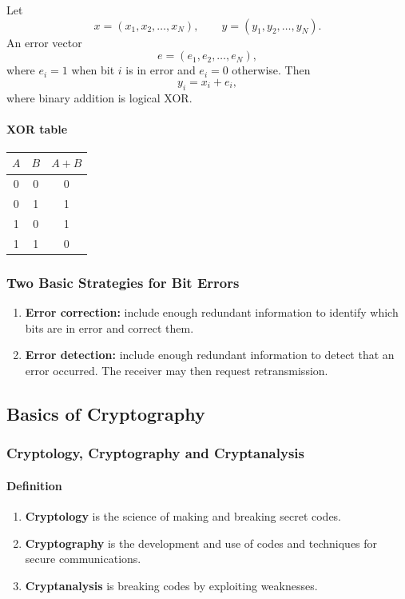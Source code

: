 \documentclass[12pt]{article}
\newcommand{\Definition}{\paragraph{Definition}}
\begin{document}
Let
\[
x=(x_1,x_2,\ldots,x_N),\qquad y=(y_1,y_2,\ldots,y_N).
\]
An error vector
\[
e=(e_1,e_2,\ldots,e_N),
\]
where $e_i=1$ when bit $i$ is in error and $e_i=0$ otherwise. Then
\[
y_i=x_i+e_i,
\]
where binary addition is logical XOR.

\paragraph{XOR table}
\begin{center}
\begin{tabular}{ccc}
\toprule
$A$ & $B$ & $A+B$\\
\midrule
0&0&0\\
0&1&1\\
1&0&1\\
1&1&0\\
\bottomrule
\end{tabular}
\end{center}

\subsubsection{Two Basic Strategies for Bit Errors}
\begin{enumerate}
    \item \textbf{Error correction:} include enough redundant information to identify which bits are in error and correct them.
    \item \textbf{Error detection:} include enough redundant information to detect that an error occurred. The receiver may then request retransmission.
\end{enumerate}

\subsection{Basics of Cryptography}

\subsubsection{Cryptology, Cryptography and Cryptanalysis}
\Definition
\begin{enumerate}
    \item \textbf{Cryptology} is the science of making and breaking secret codes.
    \item \textbf{Cryptography} is the development and use of codes and techniques for secure communications.
    \item \textbf{Cryptanalysis} is breaking codes by exploiting weaknesses.
\end{enumerate}
\end{document}
